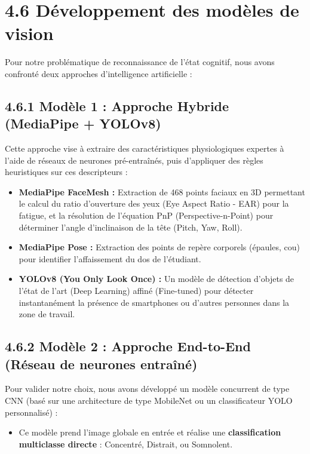 
\section{4.6 Développement des modèles de vision}
Pour notre problématique de reconnaissance de l'état cognitif, nous avons confronté deux approches d'intelligence artificielle :

\subsection{4.6.1 Modèle 1 : Approche Hybride (MediaPipe + YOLOv8)}
Cette approche vise à extraire des caractéristiques physiologiques expertes à l'aide de réseaux de neurones pré-entraînés, puis d'appliquer des règles heuristiques sur ces descripteurs :
\begin{itemize}
    \item \textbf{MediaPipe FaceMesh :} Extraction de 468 points faciaux en 3D permettant le calcul du ratio d'ouverture des yeux (Eye Aspect Ratio - EAR) pour la fatigue, et la résolution de l'équation PnP (Perspective-n-Point) pour déterminer l'angle d'inclinaison de la tête (Pitch, Yaw, Roll).
    \item \textbf{MediaPipe Pose :} Extraction des points de repère corporels (épaules, cou) pour identifier l'affaissement du dos de l'étudiant.
    \item \textbf{YOLOv8 (You Only Look Once) :} Un modèle de détection d'objets de l'état de l'art (Deep Learning) affiné (Fine-tuned) pour détecter instantanément la présence de smartphones ou d'autres personnes dans la zone de travail.
\end{itemize}

\subsection{4.6.2 Modèle 2 : Approche End-to-End (Réseau de neurones entraîné)}
Pour valider notre choix, nous avons développé un modèle concurrent de type CNN (basé sur une architecture de type MobileNet ou un classificateur YOLO personnalisé) :
\begin{itemize}
    \item Ce modèle prend l'image globale en entrée et réalise une \textbf{classification multiclasse directe} : Concentré, Distrait, ou Somnolent.
\end{itemize}


